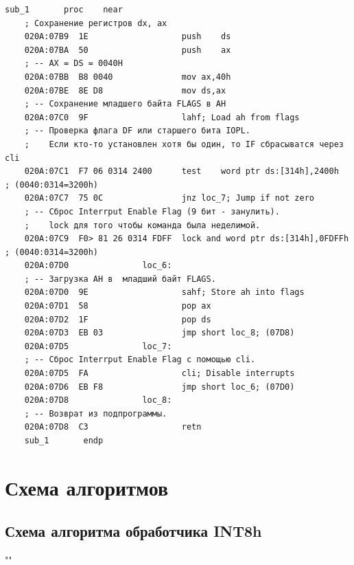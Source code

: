 \documentclass[a4paper,12pt]{article}
\begin{document}
\begin{lstlisting}[style={asm}]
	sub_1       proc    near
	; Сохранение регистров dx, ax
	020A:07B9  1E                   push    ds
	020A:07BA  50                   push    ax
	; -- AX = DS = 0040H
	020A:07BB  B8 0040              mov ax,40h
	020A:07BE  8E D8                mov ds,ax
	; -- Сохранение младшего байта FLAGS в AH
	020A:07C0  9F                   lahf; Load ah from flags
	; -- Проверка флага DF или старшего бита IOPL.
	;    Если кто-то установлен хотя бы один, то IF сбрасыватся через cli
	020A:07C1  F7 06 0314 2400      test    word ptr ds:[314h],2400h    ; (0040:0314=3200h)
	020A:07C7  75 0C                jnz loc_7; Jump if not zero
	; -- Сброс Interrput Enable Flag (9 бит - занулить). 
	;    lock для того чтобы команда была неделимой.
	020A:07C9  F0> 81 26 0314 FDFF  lock and word ptr ds:[314h],0FDFFh  ; (0040:0314=3200h)
	020A:07D0               loc_6:
	; -- Загрузка AH в  младший байт FLAGS.
	020A:07D0  9E                   sahf; Store ah into flags
	020A:07D1  58                   pop ax
	020A:07D2  1F                   pop ds
	020A:07D3  EB 03                jmp short loc_8; (07D8)
	020A:07D5               loc_7:
	; -- Сброс Interrput Enable Flag с помощью cli.
	020A:07D5  FA                   cli; Disable interrupts
	020A:07D6  EB F8                jmp short loc_6; (07D0)
	020A:07D8               loc_8:
	; -- Возврат из подпрограммы.
	020A:07D8  C3                   retn
	sub_1       endp
\end{lstlisting}
\clearpage

\section{Схема алгоритмов}

\subsection{Схема алгоритма обработчика INT8h}
""\newline
\end{document}
